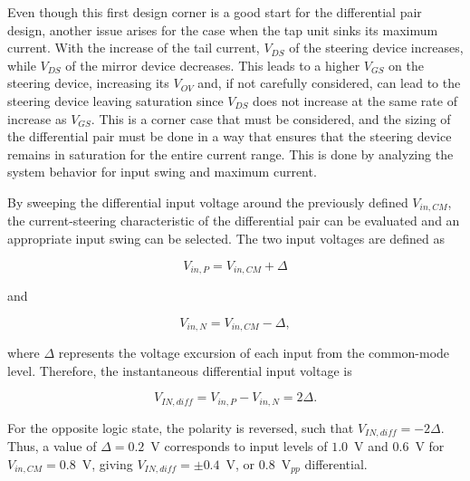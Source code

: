 Even though this first design corner is a good start for the differential pair design, another issue arises for the case when the tap unit sinks its maximum current. 
With the increase of the tail current, $V_{DS}$ of the steering device increases, while $V_{DS}$ of the mirror device decreases. This leads to a higher $V_{GS}$ on the steering device, increasing its $V_{OV}$ and, if not carefully considered, can lead to the steering device leaving saturation since $V_{DS}$ does not increase at the same rate of increase as $V_{GS}$. This is a corner case that must be considered, and the sizing of the differential pair must be done in a way that ensures that the steering device remains in saturation for the entire current range. This is done by analyzing the system behavior for input swing and maximum current.

By sweeping the differential input voltage around the previously defined $V_{in,CM}$, the current-steering characteristic of the differential pair can be evaluated and an appropriate input swing can be selected. The two input voltages are defined as

\begin{equation}
    V_{in,P}=V_{in,CM}+\Delta
\end{equation}

and

\begin{equation}
    V_{in,N}=V_{in,CM}-\Delta,
\end{equation}

where $\Delta$ represents the voltage excursion of each input from the common-mode level. Therefore, the instantaneous differential input voltage is

\begin{equation}
    V_{IN,diff}=V_{in,P}-V_{in,N}=2\Delta.
\end{equation}

For the opposite logic state, the polarity is reversed, such that $V_{IN,diff}=-2\Delta$. Thus, a value of $\Delta=0.2$~V corresponds to input levels of $1.0$~V and $0.6$~V for $V_{in,CM}=0.8$~V, giving $V_{IN,diff}=\pm0.4$~V, or $0.8$~V$_{pp}$ differential.

